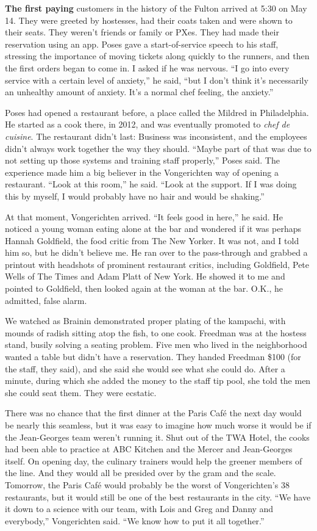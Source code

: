 \textbf{The first paying} customers in the history of the Fulton arrived
at 5:30 on May 14. They were greeted by hostesses, had their coats taken
and were shown to their seats. They weren't friends or family or PXes.
They had made their reservation using an app. Poses gave a
start-of-service speech to his staff, stressing the importance of moving
tickets along quickly to the runners, and then the first orders began to
come in. I asked if he was nervous. ``I go into every service with a
certain level of anxiety,'' he said, ``but I don't think it's
necessarily an unhealthy amount of anxiety. It's a normal chef feeling,
the anxiety.''

Poses had opened a restaurant before, a place called the Mildred in
Philadelphia. He started as a cook there, in 2012, and was eventually
promoted to \emph{chef de cuisine}. The restaurant didn't last: Business
was inconsistent, and the employees didn't always work together the way
they should. ``Maybe part of that was due to not setting up those
systems and training staff properly,'' Poses said. The experience made
him a big believer in the Vongerichten way of opening a restaurant.
``Look at this room,'' he said. ``Look at the support. If I was doing
this by myself, I would probably have no hair and would be shaking.''

At that moment, Vongerichten arrived. ``It feels good in here,'' he
said. He noticed a young woman eating alone at the bar and wondered if
it was perhaps Hannah Goldfield, the food critic from The New Yorker. It
was not, and I told him so, but he didn't believe me. He ran over to the
pass-through and grabbed a printout with headshots of prominent
restaurant critics, including Goldfield, Pete Wells of The Times and
Adam Platt of New York. He showed it to me and pointed to Goldfield,
then looked again at the woman at the bar. O.K., he admitted, false
alarm.

We watched as Brainin demonstrated proper plating of the kampachi, with
mounds of radish sitting atop the fish, to one cook. Freedman was at the
hostess stand, busily solving a seating problem. Five men who lived in
the neighborhood wanted a table but didn't have a reservation. They
handed Freedman \$100 (for the staff, they said), and she said she would
see what she could do. After a minute, during which she added the money
to the staff tip pool, she told the men she could seat them. They were
ecstatic.

There was no chance that the first dinner at the Paris Café the next day
would be nearly this seamless, but it was easy to imagine how much worse
it would be if the Jean-Georges team weren't running it. Shut out of the
TWA Hotel, the cooks had been able to practice at ABC Kitchen and the
Mercer and Jean-Georges itself. On opening day, the culinary trainers
would help the greener members of the line. And they would all be
presided over by the gram and the scale. Tomorrow, the Paris Café would
probably be the worst of Vongerichten's 38 restaurants, but it would
still be one of the best restaurants in the city. ``We have it down to a
science with our team, with Lois and Greg and Danny and everybody,''
Vongerichten said. ``We know how to put it all together.''

